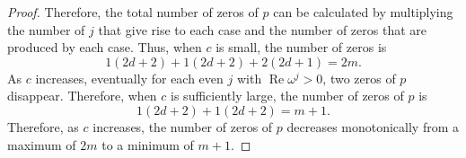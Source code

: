 \documentclass{amsart}
\renewcommand{\Re}{\operatorname{Re}}
\theoremstyle{definition}
\theoremstyle{remark}
\begin{document}
\begin{proof}

Therefore, the total number of zeros of $p$ can be calculated by multiplying the number of $j$ that give rise to each case and the number of zeros that are produced by each case. Thus, when $c$ is small, the number of zeros is
\[
1(2d+2) + 1(2d+2) + 2(2d+1) = 2m.
\]
As $c$ increases, eventually for each even $j$ with $\Re \omega^j > 0$, two zeros of $p$ disappear. Therefore, when $c$ is sufficiently large, the number of zeros of $p$ is
\[
1(2d+2) + 1(2d+2) = m + 1.
\]
Therefore, as $c$ increases, the number of zeros of $p$ decreases monotonically from a maximum of $2m$ to a minimum of $m+1$.
\end{proof}

\end{document}

